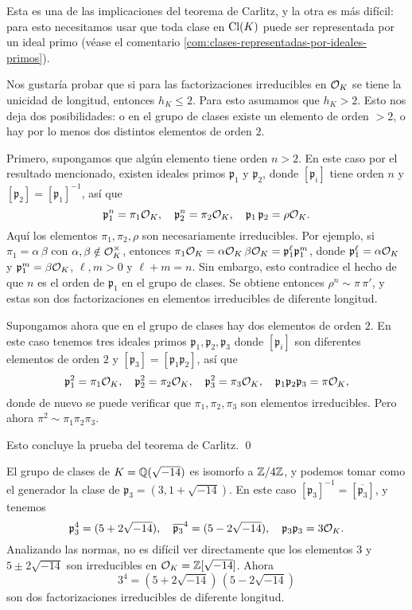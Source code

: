Esta es una de las implicaciones del teorema de Carlitz, y la otra es más
difícil: para esto necesitamos usar que toda clase en $\operatorname{Cl} (K)$ puede ser
representada por un ideal primo (véase el comentario
\ref{com:clases-representadas-por-ideales-primos}).

Nos gustaría probar que si para las factorizaciones irreducibles en $\mathcal{O}_K$ se
tiene la unicidad de longitud, entonces $h_K \le 2$. Para esto asumamos que
$h_K > 2$. Esto nos deja dos posibilidades: o en el grupo de clases existe un
elemento de orden $> 2$, o hay por lo menos dos distintos elementos de orden $2$.

Primero, supongamos que algún elemento tiene orden $n > 2$. En este caso por el
resultado mencionado, existen ideales primos $\mathfrak{p}_1$ y
$\mathfrak{p}_2$, donde $[\mathfrak{p}_i]$ tiene orden $n$
y $[\mathfrak{p}_2] = [\mathfrak{p}_1]^{-1}$, así que
$$\mathfrak{p}_1^n = \pi_1 \mathcal{O}_K, \quad \mathfrak{p}_2^n = \pi_2 \mathcal{O}_K, \quad \mathfrak{p}_1\,\mathfrak{p}_2 = \rho \mathcal{O}_K.$$
Aquí los elementos $\pi_1, \pi_2, \rho$ son necesariamente irreducibles. Por
ejemplo, si $\pi_1 = \alpha\,\beta$ con $\alpha,\beta \notin \mathcal{O}_K^\times$,
entonces
$\pi_1 \mathcal{O}_K = \alpha \mathcal{O}_K \, \beta \mathcal{O}_K = \mathfrak{p}_1^\ell \mathfrak{p}_1^m$,
donde $\mathfrak{p}_1^\ell = \alpha \mathcal{O}_K$ y $\mathfrak{p}_1^m = \beta \mathcal{O}_K$,
$\ell,m > 0$ y $\ell + m = n$. Sin embargo, esto contradice el hecho de que
$n$ es el orden de $\mathfrak{p}_1$ en el grupo de clases. Se obtiene entonces
$\rho^n \sim \pi\,\pi'$, y estas son dos factorizaciones en elementos
irreducibles de diferente longitud.

Supongamos ahora que en el grupo de clases hay dos elementos de orden $2$.
En este caso tenemos tres ideales primos
$\mathfrak{p}_1,\mathfrak{p}_2,\mathfrak{p}_3$ donde
$[\mathfrak{p}_i]$ son diferentes elementos de orden $2$ y
$[\mathfrak{p}_3] = [\mathfrak{p}_1\mathfrak{p}_2]$, así que
\[ \mathfrak{p}_1^2 = \pi_1 \mathcal{O}_K, \quad
   \mathfrak{p}_2^2 = \pi_2 \mathcal{O}_K, \quad
   \mathfrak{p}_3^2 = \pi_3 \mathcal{O}_K, \quad
   \mathfrak{p}_1\mathfrak{p}_2\mathfrak{p}_3 = \pi \mathcal{O}_K, \]
donde de nuevo se puede verificar que $\pi_1, \pi_2, \pi_3$ son elementos
irreducibles. Pero ahora $\pi^2 \sim \pi_1\pi_2\pi_3$.

Esto concluye la prueba del teorema de Carlitz. \qed

\begin{ejemplo}
  El grupo de clases de $K = \mathbb{Q} (\sqrt{-14})$ es isomorfo a $\mathbb{Z}/4\mathbb{Z}$,
  y podemos tomar como el generador la clase de
  $\mathfrak{p}_3 = (3, 1 + \sqrt{-14})$. En este caso
  $[\mathfrak{p}_3]^{-1} = [\overline{\mathfrak{p}_3}]$, y tenemos
  \[ \mathfrak{p}_3^4 = (5 + 2\sqrt{-14}), \quad
     \overline{\mathfrak{p}_3}^4 = (5 - 2\sqrt{-14}), \quad
     \mathfrak{p}_3 \mathfrak{p}_3 = 3 \mathcal{O}_K. \]
  Analizando las normas, no es difícil ver directamente que los elementos $3$ y
  $5 \pm 2\sqrt{-14}$ son irreducibles en $\mathcal{O}_K = \mathbb{Z} [\sqrt{-14}]$. Ahora
  $$3^4 = (5 + 2\sqrt{-14})\,(5 - 2\sqrt{-14})$$
  son dos factorizaciones irreducibles de diferente longitud.
\end{ejemplo}

